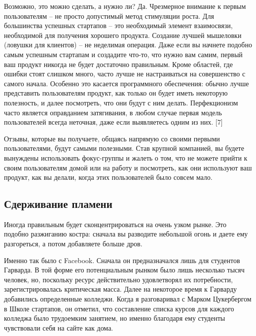\documentclass[ebook,12pt,oneside,openany]{memoir}
\begin{document}
Возможно, это можно сделать, а нужно ли? Да. Чрезмерное внимание к
первым пользователям – не просто допустимый метод стимуляции роста.
Для большинства успешных стартапов – это необходимый элемент
взаимосвязи, необходимой для получения хорошего продукта. Создание
лучшей мышеловки (ловушки для клиентов) – не неделимая операция. Даже
если вы начнете подобно самым успешным стартапам и создадите что-то,
что нужно вам самим, первый ваш продукт никогда не будет достаточно
правильным. Кроме областей, где ошибки стоят слишком много, часто
лучше не настраиваться на совершенство с самого начала. Особенно это
касается программного обеспечения: обычно лучше представить
пользователям продукт, как только он будет иметь некоторую полезность,
и далее посмотреть, что они будут с ним делать. Перфекционизм часто
является оправданием затягивания, в любом случае первая модель
пользователей всегда неточная, даже если выявляетесь одним из них. [7] \newline

Отзывы, которые вы получаете, общаясь напрямую со своими первыми
пользователями, будут самыми полезными. Став крупной компанией, вы
будете вынуждены использовать фокус-группы и жалеть о том, что не
можете прийти к своим пользователям домой или на работу и посмотреть,
как они используют ваш продукт, как вы делали, когда этих
пользователей было совсем мало. \newline

\subsection{Сдерживание пламени}

Иногда правильным будет сконцентрироваться на очень узком рынке. Это
подобно разжиганию костра: сначала вы разводите небольшой огонь и
даете ему разгореться, а потом добавляете больше дров. \newline

Именно так было с Facebook. Сначала он предназначался лишь для
студентов Гарварда. В той форме его потенциальным рынком было лишь
несколько тысяч человек, но, поскольку ресурс действительно
удовлетворял их потребности, зарегистрировалась критическая масса.
Далее на некоторое время к Гарварду добавились определенные колледжи.
Когда я разговаривал с Марком Цукербергом в Школе стартапов, он
отметил, что составление списка курсов для каждого колледжа было
трудоемким занятием, но именно благодаря ему студенты чувствовали себя
на сайте как дома. \newline
\end{document}
